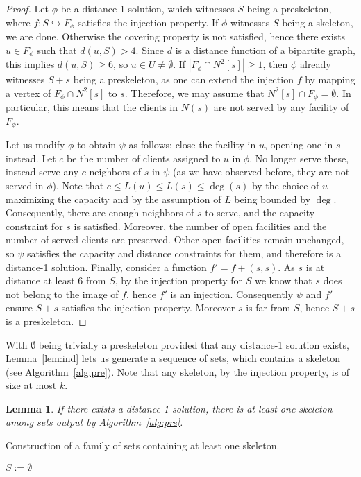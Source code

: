 \documentclass{article}
\newcommand{\F}{\mathcal{F}}
\theoremstyle{plain}
\newtheorem{lemma}[theorem]{Lemma}
\theoremstyle{definition}
\begin{document}
\begin{proof}
Let $\phi$ be a distance-1 solution, which witnesses $S$ being a preskeleton,
where $f : S \hookrightarrow F_\phi$ satisfies the injection property.
If $\phi$ witnesses $S$ being a skeleton, we are done.
Otherwise the covering property is not satisfied,
hence there exists $u\in F_\phi$ such that $d(u,S)>4$.
Since $d$ is a distance function of a bipartite graph, 
this implies $d(u,S)\ge 6$, so $u\in U \ne \emptyset$.
If $|F_\phi \cap N^2[s]|\ge 1$, then $\phi$ already witnesses $S+s$ being a
preskeleton, as one can extend the injection $f$ by mapping 
a vertex of $F_\phi \cap N^2[s]$ to $s$.
Therefore, we may assume that $N^2[s]\cap F_\phi = \emptyset$.
In particular, this means that the clients in $N(s)$ are not served by any
facility of $F_\phi$.

Let us modify $\phi$ to obtain $\psi$ as follows:
close the facility in $u$, opening one in $s$ instead.
Let $c$ be the number of clients assigned to $u$ in $\phi$.
No longer serve these, instead serve any $c$ neighbors of $s$ in
$\psi$ (as we have observed before, they are not served in $\phi$).
Note that $c\le L(u)\le L(s)\le \deg(s)$ by the choice of $u$ maximizing the
capacity and by the assumption of $L$ being bounded by $\deg$.
Consequently, there are enough neighbors of $s$ to serve, and the capacity
constraint for $s$ is satisfied.
Moreover, the number of open facilities and the number of served clients are
preserved.
Other open facilities remain unchanged, so $\psi$ satisfies
the capacity and distance constraints for them, and therefore is a distance-1 solution.
Finally, consider a function $f'=f + (s, s)$.
As $s$ is at distance at least $6$ from $S$, by the 
injection property for $S$ we know that $s$ does not belong to the image of $f$,
hence $f'$ is an injection.
Consequently $\psi$ and $f'$ ensure $S+s$ satisfies the injection property.
Moreover $s$ is far from $S$, hence $S+s$ is a preskeleton.
\end{proof}

With $\emptyset$ being trivially a preskeleton provided that any distance-1
solution exists, Lemma~\ref{lem:ind} lets us generate a sequence of
sets, which contains a skeleton (see Algorithm~\ref{alg:pre}).
Note that any skeleton, by the injection property, is of size at most $k$.

\begin{lemma}
If there exists a distance-1 solution, there is at least one skeleton among sets
output by Algorithm~\ref{alg:pre}.
\end{lemma}
\begin{algorithm}
\caption{Construction of a family of sets containing at least one skeleton.}\label{alg:pre}
$S := \emptyset$\;
\While{$|S|\le k-1$}{
	$U := \{u\in \F \; : \; d(u,S) \ge 6\}$\;
	\lIf {$U = \emptyset$}{\KwSty{break}}\;
	$s := \textrm{argmax}\{ L(u) \; : \; u \in U\}$\;
	$S := S + s$\;
	\KwSty{output} $S$\;
}
\vspace{.2cm}
\end{algorithm} 
\end{document}

